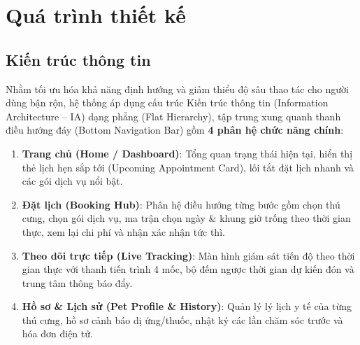 \section{Quá trình thiết kế}

\subsection{Kiến trúc thông tin}
Nhằm tối ưu hóa khả năng định hướng và giảm thiểu độ sâu thao tác cho người dùng bận rộn, hệ thống áp dụng cấu trúc Kiến trúc thông tin (Information Architecture -- IA) dạng phẳng (Flat Hierarchy), tập trung xung quanh thanh điều hướng đáy (Bottom Navigation Bar) gồm \textbf{4 phân hệ chức năng chính}:
\begin{enumerate}
    \item \textbf{Trang chủ (Home / Dashboard)}: Tổng quan trạng thái hiện tại, hiển thị thẻ lịch hẹn sắp tới (Upcoming Appointment Card), lối tắt đặt lịch nhanh và các gói dịch vụ nổi bật.
    \item \textbf{Đặt lịch (Booking Hub)}: Phân hệ điều hướng từng bước gồm chọn thú cưng, chọn gói dịch vụ, ma trận chọn ngày \& khung giờ trống theo thời gian thực, xem lại chi phí và nhận xác nhận tức thì.
    \item \textbf{Theo dõi trực tiếp (Live Tracking)}: Màn hình giám sát tiến độ theo thời gian thực với thanh tiến trình 4 mốc, bộ đếm ngược thời gian dự kiến đón và trung tâm thông báo đẩy.
    \item \textbf{Hồ sơ \& Lịch sử (Pet Profile \& History)}: Quản lý lý lịch y tế của từng thú cưng, hồ sơ cảnh báo dị ứng/thuốc, nhật ký các lần chăm sóc trước và hóa đơn điện tử.
\end{enumerate}

